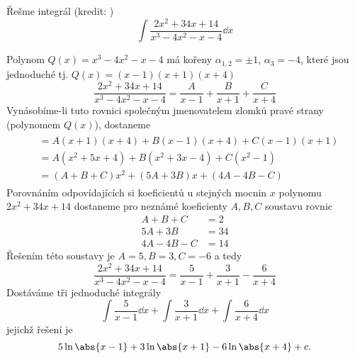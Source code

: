 \begin{mdframed}[style=mdexam]
  \begin{example}\label{MAI:exam115}
    Řešme integrál  (kredit: \cite[s.~90]{Knichal})
    \begin{equation}
      \int{\frac{2x^2+34x+14}{x^3-4x^2-x-4}}\dd{x}
    \end{equation}
    
    Polynom $Q(x)=x^3-4x^2-x-4$ má kořeny $\alpha_{1,2}=\pm1$, $\alpha_{3}=-4$, které jsou
    jednoduché tj. $Q(x)=(x-1)(x+1)(x+4)$ $$\frac{2x^2+34x+14}{x^3-4x^2-x-4} =
    \frac{A}{x-1}+\frac{B}{x+1}+\frac{C}{x+4}$$ Vynásobíme-li tuto rovnici společným
    jmenovatelem zlomků pravé strany (polynomem $Q(x)$), dostaneme
    \begin{gather*}
        \begin{align*}
          &= A(x+1)(x+4) + B(x-1)(x+4) + C(x-1)(x+1) \\
          &= A(x^2+5x+4) + B(x^2+3x-4) + C(x^2-1)    \\
          &= (A+B+C)x^2  + (5A+3B)x    + (4A-4B-C)
        \end{align*}
    \end{gather*}
    Porovnáním odpovídajících si koeficientů u stejných mocnin $x$ polynomu \(2x^2+34x+14\)
    dostaneme pro nez\-ná\-mé koeficienty $A, B, C$ soustavu rovnic
    \begin{align*}
       A+   B + C &= 2 \\
      5A + 3B     &= 34 \\
      4A - 4B - C &= 14
    \end{align*}
    Řešením této soustavy je $A = 5, B = 3, C = -6$ a tedy
    $$\frac{2x^2+34x+14}{x^3-4x^2-x-4} = \frac{5}{x-1}+\frac{3}{x+1}-\frac{6}{x+4}$$
    Dostáváme tři jednoduché integrály
    \begin{equation*}
      \int{\frac{5}{x-1}}\dd{x} + \int{\frac{3}{x+1}}\dd{x} + \int{\frac{6}{x+4}}\dd{x}            
    \end{equation*}
    jejichž řešení je 
    \begin{equation*}
      5\ln\abs{x-1} +  3\ln\abs{x+1} - 6\ln\abs{x+4} +c.
    \end{equation*}
  \end{example}
\end{mdframed}